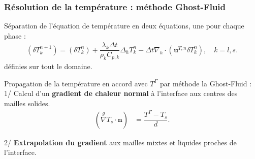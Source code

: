 \documentclass{beamer}
\newcommand{\inte}{\Gamma}
\newcommand{\vect}[1]{\bm{#1}}
\newcommand{\norm}{\vect{n}}
\newcommand{\npl}{{n+1}}
\newcommand{\ghost}{\overset{{g}}{\nabla}}
\renewcommand{\frac}{\dfrac}
\begin{document}
\begin{frame}
    \frametitle{Résolution de la température : méthode Ghost-Fluid}
    	\footnotesize
\begin{ceablock}{Séparation de l'équation de température en deux équations, une pour chaque phase :}
\begin{align}
 (\delta T_k^\npl)   = (\delta T^n_k) + \frac{\lambda_k \Delta t }{\rho_k C_{p,k}}  \Delta_h T_k^n - \Delta t \nabla_h \cdot ( \vect{u}^{T,n} \delta T_k^n), \quad k=l,s.
\end{align}
définies sur tout le domaine. 
\end{ceablock}
\vspace{0.3cm}
\begin{ceablock}{Propagation de la température en accord avec $T^\inte$ par méthode la Ghost-Fluid :}
1/ Calcul d'un \textbf{gradient de chaleur normal} à l'interface aux  centres des mailles solides.
\begin{align}
 (\ghost T_s \cdot \norm) &= \frac{T^\inte - T_s}{d}.
\end{align}
\end{ceablock}
2/ \textbf{Extrapolation du gradient} aux mailles mixtes et liquides proches de l'interface.
\begin{center}
		\begin{tikzpicture}[scale = 0.65, every node/.style={scale=0.65}]
			
		\end{tikzpicture}

\end{center}
\end{frame}
\end{document}
